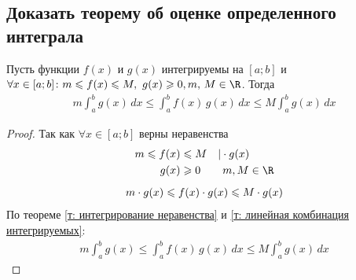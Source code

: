 \subsection{Доказать теорему об оценке определенного интеграла}
\setcounter{theorem}{10}
\begin{theorem}
    Пусть функции $f(x)$ и $g(x)$ интегрируемы на $[a;b]$ и $\forall x \in [a;b]\colon m \leqslant f(x) \leqslant M,\ {g(x) \geqslant 0},\break m,\, M \in \R$. Тогда
    \begin{gather*}
        \boxed{m \int_{a}^{b} g(x)\, dx \leqslant \int_{a}^{b} f(x)\, g(x)\, dx \leqslant M \int_{a}^{b} g(x)\, dx}
    \end{gather*}
\end{theorem}
\begin{proof}
    Так как $\forall x \in [a;b]$ верны неравенства
    \begin{gather*}
        \begin{aligned}
            m \leqslant f(x) &\leqslant M\quad | \cdot g(x) \\
            g(x) &\geqslant 0\qquad m, M \in \R
        \end{aligned} \\[1ex]
        m\cdot g(x) \leqslant f(x)\cdot g(x) \leqslant M \cdot g(x)
    \end{gather*}
    По теореме \ref{т: интегрирование неравенства} и \ref{т: линейная комбинация интегрируемых}:
    \begin{gather*}
        m \int_{a}^{b} g(x) \leqslant \int_{a}^{b} f(x)\, g(x)\, dx \leqslant M \int_{a}^{b} g(x)\, dx
    \end{gather*}
\end{proof}


